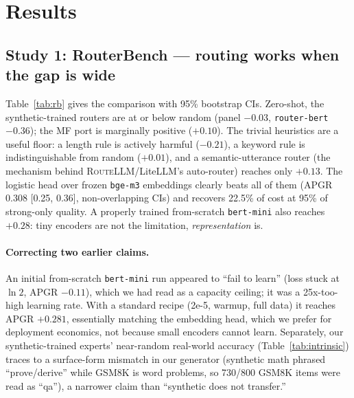 \documentclass[11pt]{article}
\newcommand{\rl}{\textsc{RouteLLM}}
\newcommand{\code}[1]{\texttt{\small #1}}
\newcommand{\ROUTEREMBAPGR}{0.308}
\newcommand{\ROUTEREMBSAVED}{22.5}
\begin{document}
\section{Results}
\subsection{Study 1: RouterBench --- routing works when the gap is wide}
Table~\ref{tab:rb} gives the comparison with 95\% bootstrap CIs. Zero-shot, the
synthetic-trained routers are at or below random (panel $-0.03$, \code{router-bert}
$-0.36$); the MF port is marginally positive ($+0.10$). The trivial heuristics are a
useful floor: a length rule is actively harmful ($-0.21$), a keyword rule is
indistinguishable from random ($+0.01$), and a semantic-utterance router (the mechanism
behind \rl{}/LiteLLM's auto-router) reaches only $+0.13$. The logistic head over frozen
\code{bge-m3} embeddings clearly beats all of them (APGR \ROUTEREMBAPGR{} [0.25, 0.36],
non-overlapping CIs) and recovers \ROUTEREMBSAVED\% of cost at 95\% of strong-only
quality. A properly trained from-scratch \code{bert-mini} also reaches $+0.28$: tiny
encoders are not the limitation, \emph{representation} is.

\paragraph{Correcting two earlier claims.} An initial from-scratch \code{bert-mini} run
appeared to ``fail to learn'' (loss stuck at $\ln 2$, APGR $-0.11$), which we had read as
a capacity ceiling; it was a 25x-too-high learning rate. With a standard recipe (2e-5,
warmup, full data) it reaches APGR $+0.281$, essentially matching the embedding head, which
we prefer for deployment economics, not because small encoders cannot learn. Separately,
our synthetic-trained experts' near-random real-world accuracy (Table~\ref{tab:intrinsic})
traces to a surface-form mismatch in our generator (synthetic math phrased ``prove/derive''
while GSM8K is word problems, so 730/800 GSM8K items were read as ``qa''), a narrower claim
than ``synthetic does not transfer.''
\end{document}
